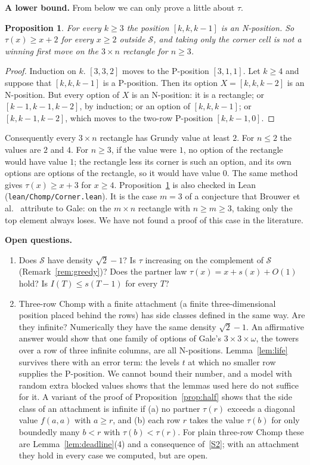 \documentclass[11pt]{amsart}
\newtheorem{proposition}[theorem]{Proposition}
\theoremstyle{definition}
\theoremstyle{remark}
\newcommand{\Sc}{\mathcal{S}}
\begin{document}
\noindent\textbf{A lower bound.} From below we can only prove a little about $\tau$.

\begin{proposition}\label{prop:corner}
For every $k\ge3$ the position $[k,k,k-1]$ is an N-position. So $\tau(x)\ge x+2$ for every
$x\ge2$ outside $\Sc$, and taking only the corner cell is not a winning first move on the
$3\times n$ rectangle for $n\ge3$.
\end{proposition}

\begin{proof}
Induction on $k$. $[3,3,2]$ moves to the P-position $[3,1,1]$. Let $k\ge4$ and suppose that
$[k,k,k-1]$ is a P-position. Then its option $X=[k,k,k-2]$ is an N-position. But every option
of $X$ is an N-position: it is a rectangle; or $[k-1,k-1,k-2]$, by induction; or an option of
$[k,k,k-1]$; or $[k,k-1,k-2]$, which moves to the two-row P-position $[k,k-1,0]$.
\end{proof}

\noindent Consequently every $3\times n$ rectangle has Grundy value at least $2$. For $n\le2$
the values are $2$ and $4$. For $n\ge3$, if the value were $1$, no option of the rectangle
would have value $1$; the rectangle less its corner is such an option, and its own options are
options of the rectangle, so it would have value $0$. The same method gives $\tau(x)\ge x+3$
for $x\ge4$. Proposition~\ref{prop:corner} is
also checked in Lean (\texttt{lean/Chomp/Corner.lean}).
It is the case $m=3$ of a conjecture that Brouwer et al.\ \cite[\S7.2]{BHMS} attribute to
Gale: on the $m\times n$ rectangle with $n\ge m\ge3$, taking only the top element always
loses. We have not found a proof of this case in the literature.

\medskip
\noindent\textbf{Open questions.}
\begin{enumerate}
\item Does $\Sc$ have density $\sqrt2-1$? Is $\tau$ increasing on the complement of $\Sc$
  (Remark~\ref{rem:greedy})? Does the partner law $\tau(x)=x+s(x)+O(1)$ hold? Is
  $I(T)\le s(T-1)$ for every $T$?
\item Three-row Chomp with a finite attachment (a finite three-dimensional position placed
  behind the rows) has side classes defined in the same way. Are they infinite? Numerically they
  have the same density $\sqrt2-1$. An affirmative answer would show that one family of
  options of Gale's $3\times3\times\omega$, the towers over a row of three infinite columns, are
  all N-positions. Lemma~\ref{lem:life} survives there with an error term: the levels $t$ at
  which no smaller row supplies the P-position. We cannot bound their number, and a model with
  random extra blocked values shows that the lemmas used here do not suffice for it. A variant
  of the proof of Proposition~\ref{prop:half} shows that the side class of an attachment is
  infinite if (a) no partner $\tau(r)$ exceeds a diagonal value $f(a,a)$ with $a\ge r$, and (b)
  each row $r$ takes the value $\tau(b)$ for only boundedly many $b<r$ with $\tau(b)<\tau(r)$.
  For plain three-row Chomp these are Lemma~\ref{lem:deadline}(4) and a consequence
  of~\ref{S2}; with an attachment they hold in every case we computed, but are open.
\end{enumerate}
\end{document}
